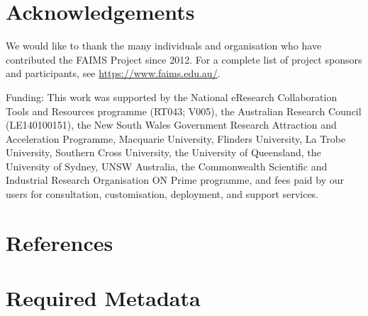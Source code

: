 \documentclass[preprint,12pt, a4paper]{elsarticle}
\begin{document}
\appendix


\section*{Acknowledgements}
\label{}

We would like to thank the many individuals and organisation who have contributed the FAIMS Project since 2012. For a complete list of project sponsors and participants, see \url{https://www.faims.edu.au/}.

Funding: 	This work was supported by the National eResearch Collaboration Tools and Resources programme (RT043; V005), the Australian Research Council (LE140100151), the New South Wales Government Research Attraction and Acceleration Programme, Macquarie University, Flinders University, La Trobe University, Southern Cross University, the University of Queensland, the University of Sydney, UNSW Australia, the Commonwealth Scientific and Industrial Research Organisation ON Prime programme, and fees paid by our users for consultation, customisation, deployment, and support services.


\section*{References}
\label{}

 







\section*{Required Metadata}
\label{}
\end{document}
